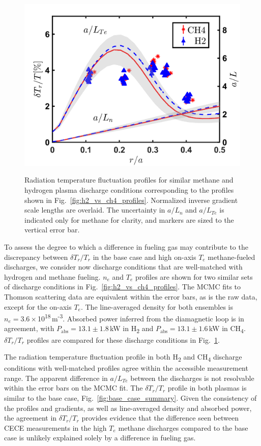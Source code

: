 \documentclass[%
 aip,
 amsmath,amssymb,
 reprint,%
]{revtex4-1}
\begin{document}
\begin{figure}[!htbp]
\centering
{\includegraphics[width=.45\textwidth]{Figures/fluc_ch4_h2_overlay.png}}
\hfill

\caption{Radiation temperature fluctuation profiles for similar methane and hydrogen plasma discharge conditions corresponding to the profiles shown in Fig.\ \ref{fig:h2_vs_ch4_profiles}. Normalized inverse gradient scale lengths are overlaid. The uncertainty in $a/L_n$ and $a/L_{Te}$ is indicated only for methane for clarity, and markers are sized to the vertical error bar.}
\label{fig:h2_ch4_dT_overlay}
\end{figure}

To assess the degree to which a difference in fueling gas may contribute to the discrepancy between $\delta T_r/T_r$ in the base case and high on-axis $T_e$ methane-fueled discharges, we consider now discharge conditions that are well-matched with hydrogen and methane fueling. $n_e$ and $T_e$ profiles are shown for two similar sets of discharge conditions in Fig.\ \ref{fig:h2_vs_ch4_profiles}. The MCMC fits to Thomson scattering data are equivalent within the error bars, as is the raw data, except for the on-axis $T_e$. The line-averaged density for both ensembles is $n_e=3.6\times$10\textsuperscript{18}\,m\textsuperscript{-3}. Absorbed power inferred from the diamagnetic loop is in agreement, with $P_{\mathrm{abs}}=13.1\pm 1.8$\,kW in H\textsubscript{2} and $P_{\mathrm{abs}}=13.1 \pm 1.6$\,kW in CH\textsubscript{4}. $\delta T_r/T_r$ profiles are compared for these discharge conditions in Fig.\ \ref{fig:h2_ch4_dT_overlay}.

The radiation temperature fluctuation profile in both H\textsubscript{2} and CH\textsubscript{4} discharge conditions with well-matched profiles agree within the accessible measurement range. The apparent difference in $a/L_{Te}$ between the discharges is not resolvable within the error bars on the MCMC fit. The $\delta T_r/T_r$ profile in both plasmas is similar to the base case, Fig.\ \ref{fig:base_case_summary}. Given the consistency of the profiles and gradients, as well as line-averaged density and absorbed power, the agreement in $\delta T_r/T_r$ provides evidence that the difference seen between CECE measurements in the high $T_e$ methane discharges compared to the base case is unlikely explained solely by a difference in fueling gas.
\end{document}
